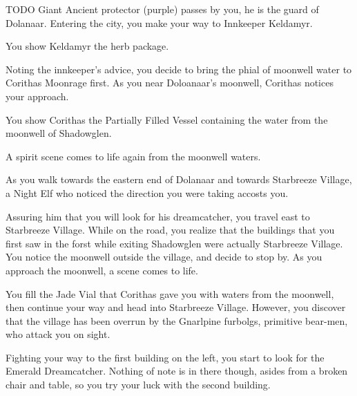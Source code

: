 TODO Giant Ancient protector (purple) passes by you, he is the guard of Dolanaar. Entering the city, you make your way to Innkeeper Keldamyr.


You show Keldamyr the herb package.


Noting the innkeeper's advice, you decide to bring the phial of moonwell water to Corithas Moonrage first. As you near Doloanaar's moonwell, Corithas notices your approach.


You show Corithas the Partially Filled Vessel containing the water from the moonwell of Shadowglen.


A spirit scene comes to life again from the moonwell waters.



As you walk towards the eastern end of Dolanaar and towards Starbreeze Village, a Night Elf who noticed the direction you were taking accosts you.


Assuring him that you will look for his dreamcatcher, you travel east to Starbreeze Village. While on the road, you realize that the buildings that you first saw in the forst while exiting Shadowglen were actually Starbreeze Village. You notice the moonwell outside the village, and decide to stop by. As you approach the moonwell, a scene comes to life.


You fill the Jade Vial that Corithas gave you with waters from the moonwell, then continue your way and head into Starbreeze Village. However, you discover that the village has been overrun by the Gnarlpine furbolgs, primitive bear-men, who attack you on sight.


Fighting your way to the first building on the left, you start to look for the Emerald Dreamcatcher. Nothing of note is in there though, asides from a broken chair and table, so you try your luck with the second building.

